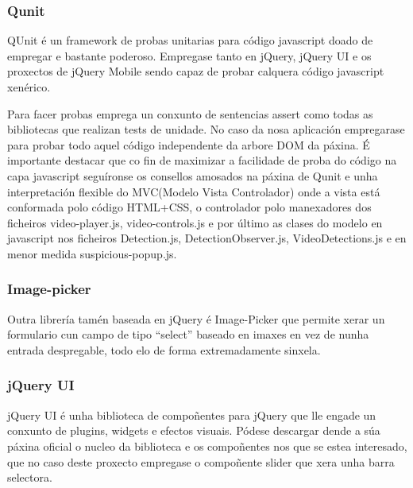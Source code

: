         \subsubsection{Qunit}
        
            QUnit é un framework de probas unitarias para código javascript doado de empregar e bastante
            poderoso. Empregase tanto en jQuery, jQuery UI e os proxectos de jQuery Mobile sendo capaz 
            de probar calquera código javascript xenérico.
            
            Para facer probas emprega un conxunto de sentencias assert como todas as bibliotecas que 
            realizan tests de unidade. No caso da nosa aplicación empregarase para probar todo aquel
            código independente da arbore DOM da páxina. É importante destacar que co fin de maximizar
            a facilidade de proba do código na capa javascript seguíronse os consellos amosados na páxina
            de Qunit\cite{QunitMakeItTesteable} e unha interpretación flexible do MVC(Modelo 
            Vista Controlador) onde a vista está conformada polo código HTML+CSS, o controlador polo 
            manexadores dos ficheiros video-player.js, video-controls.js e por último as clases do 
            modelo en javascript nos ficheiros Detection.js, DetectionObserver.js, VideoDetections.js e 
            en menor medida suspicious-popup.js.
        
        \subsubsection{Image-picker}
        
            Outra librería tamén baseada en jQuery é Image-Picker \cite{ImagePickerPage} que permite
            xerar un formulario cun campo de tipo ``select'' baseado en imaxes en vez de nunha 
            entrada despregable, todo elo de forma extremadamente sinxela.
        
        \subsubsection{jQuery UI}
        
            jQuery UI é unha biblioteca de compoñentes para jQuery que lle engade un conxunto de 
            plugins, widgets e efectos visuais. Pódese descargar dende a súa páxina oficial o 
            nucleo da biblioteca e os compoñentes nos que se estea interesado, que no caso deste
            proxecto  empregase o compoñente slider\cite{ComponenteSliderJqueryUi} que
            xera unha barra selectora.
        
